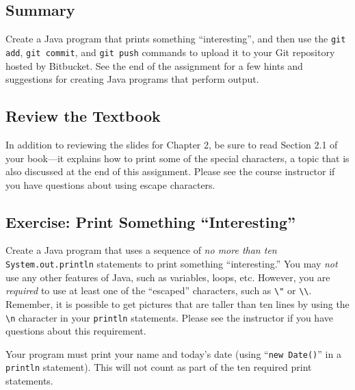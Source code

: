 


\subsection*{Summary}

Create a Java program that prints something ``interesting'', and then use the {\tt git add}, {\tt git commit}, and {\tt git
  push} commands to upload it to your Git repository hosted by Bitbucket.  See the end of the assignment for a few hints
and suggestions for creating Java programs that perform output.

\vspace*{-.1in}
\subsection*{Review the Textbook}

In addition to reviewing the slides for Chapter 2, be sure to read Section 2.1 of your book---it explains how
to print some of the special characters, a topic that is also discussed at the end of this assignment. Please see the
course instructor if you have questions about using escape characters.

\vspace*{-.1in}
\subsection*{Exercise: Print Something ``Interesting''}

Create a Java program that uses a sequence of {\em no more than ten} {\tt System.out.println} statements to print
something ``interesting.'' You may {\em not} use any other features of Java, such as variables, loops, etc.  However,
you are {\em required} to use at least one of the ``escaped'' characters, such as \verb$\"$ or \verb$\\$.  Remember, it
is possible to get pictures that are taller than ten lines by using the \verb$\n$ character in your {\tt println}
statements. Please see the instructor if you have questions about this requirement.

Your program must print your name and today's date (using ``{\tt new Date()}'' in a {\tt println} statement).  This will
not count as part of the ten required print statements.

